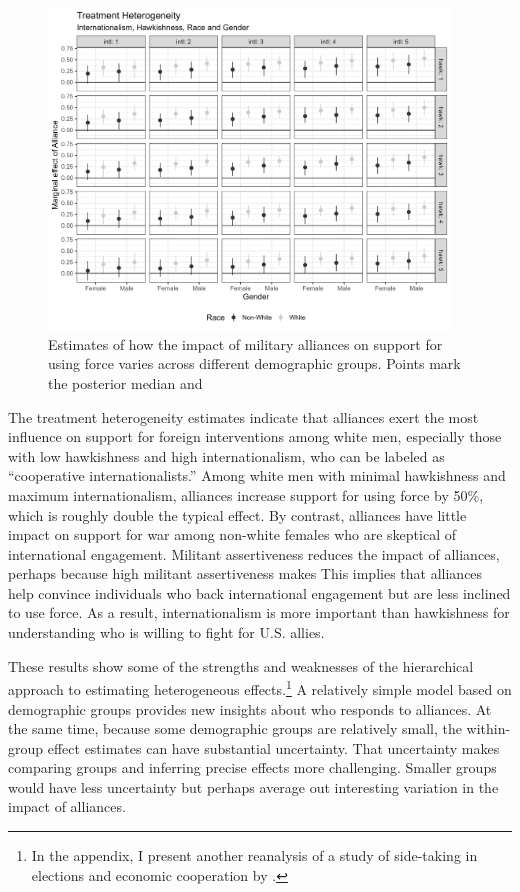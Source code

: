 \documentclass[12pt]{article}
\begin{document}
\begin{figure}[htpb]
	\centering
		\includegraphics[width=0.95\textwidth]{../figures/tw-treat-het.png}
	\caption{Estimates of how the impact of military alliances on support for using force varies across different demographic groups. Points mark the posterior median and }
	\label{fig:tw-treat-het}
\end{figure}


The treatment heterogeneity estimates indicate that alliances exert the most influence on support for foreign interventions among white men, especially those with low hawkishness and high internationalism, who can be labeled as ``cooperative internationalists.'' 
Among white men with minimal hawkishness and maximum internationalism, alliances increase support for using force by 50\%, which is roughly double the typical effect. 
By contrast, alliances have little impact on support for war among non-white females who are skeptical of international engagement.
Militant assertiveness reduces the impact of alliances, perhaps because high militant assertiveness makes  
This implies that alliances help convince individuals who back international engagement but are less inclined to use force. 
As a result, internationalism is more important than hawkishness for understanding who is willing to fight for U.S. allies. 


These results show some of the strengths and weaknesses of the hierarchical approach to estimating heterogeneous effects.\footnote{In the appendix, I present another reanalysis of a study of side-taking in elections and economic cooperation by \citet{BushPrather2020}.}
A relatively simple model based on demographic groups provides new insights about who responds to alliances. 
At the same time, because some demographic groups are relatively small, the within-group effect estimates can have substantial uncertainty. 
That uncertainty makes comparing groups and inferring precise effects more challenging. 
Smaller groups would have less uncertainty but perhaps average out interesting variation in the impact of alliances. 
\end{document}
